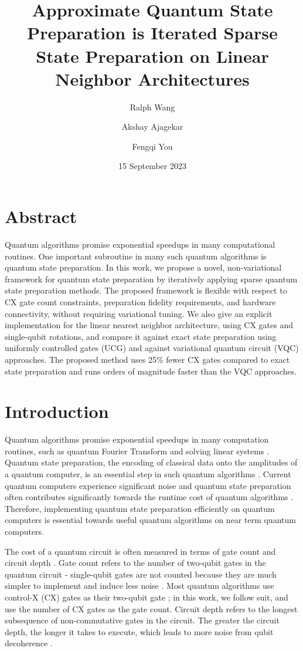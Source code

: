 \documentclass{article}
\begin{document}
\title{Approximate Quantum State Preparation is Iterated Sparse State Preparation on Linear Neighbor Architectures}
\author{Ralph Wang}
\author{Akshay Ajagekar}
\author{Fengqi You}
\date{15 September 2023}
\maketitle

\section*{Abstract}
Quantum algorithms promise exponential speedups in many computational routines.
One important
subroutine in many such quantum algorithms is quantum state preparation. In this
work, we propose a novel, non-variational framework for quantum state 
preparation by iteratively applying sparse quantum state preparation methods.
The proposed framework is flexible with respect to CX gate count constraints,
preparation fidelity requirements, and hardware connectivity, without requiring
variational tuning.
We also give an explicit implementation for the linear nearest neighbor 
architecture, using CX
gates and single-qubit rotations, and compare it against exact state 
preparation using uniformly controlled gates (UCG) and against variational 
quantum circuit 
(VQC) approaches. The proposed method uses 25\% fewer CX gates compared to exact
state preparation and runs orders of magnitude faster than the VQC approaches.

\section{Introduction}
Quantum algorithms promise exponential speedups in many computation routines, 
such as quantum Fourier Transform \cite{shor1994algorithms} and solving linear 
systems \cite{PhysRevLett.103.150502}. Quantum state preparation, the encoding
of classical data onto the amplitudes of a quantum computer, is an
essential step in such quantum algorithms \cite{aaronson2015read}. Current
quantum computers experience significant noise and quantum state preparation
often contributes significantly towards the runtime cost of quantum
algorithms \cite{aaronson2015read}. Therefore, implementing quantum state preparation efficiently on
quantum computers is essential towards useful quantum algorithms on near term
quantum computers.

The cost of a quantum circuit is often measured in terms of gate count and
circuit depth \cite{1629135}. Gate count refers to the number of two-qubit gates in the
quantum circuit - single-qubit gates are not counted because they are much
simpler to implement and induce less noise \cite{1629135}. Most quantum 
algorithms use
control-X (CX) gates as their two-qubit gate \cite{PhysRevLett.103.150502, 1629135, zhang2020toward}; in this work, we follow suit, and
use the number of CX gates as the gate count. Circuit depth refers to the 
longest subsequence of non-commutative gates in the circuit. The greater 
the circuit depth, the longer it takes to execute, which leads to more noise 
from qubit decoherence \cite{10044235}.
\end{document}
